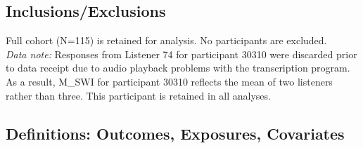 \documentclass{article}
\begin{document}
\subsection*{Inclusions/Exclusions}\label{sec:inclusions}
Full cohort (N=115) is retained for analysis. No participants are excluded. \\

\noindent \textit{Data note:} Responses from Listener 74 for participant 30310 were discarded 
prior to data receipt due to audio playback problems with the transcription program. 
As a result, M\_SWI for participant 30310 reflects the mean of two listeners rather 
than three. This participant is retained in all analyses.

\subsection*{Definitions: Outcomes, Exposures, Covariates}\label{sec:definitions}
\end{document}
